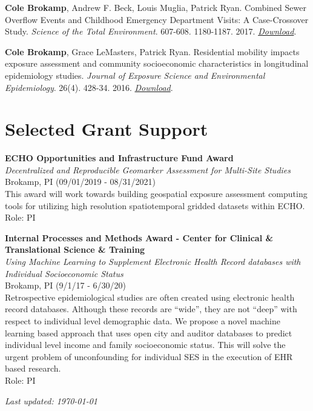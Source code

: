 \documentclass[margin,line]{res}
\begin{document}
\begin{resume}
\textbf{Cole Brokamp}, Andrew F. Beck, Louis Muglia, Patrick Ryan.
Combined Sewer Overflow Events and Childhood Emergency Department
Visits: A Case-Crossover Study. \emph{Science of the Total Environment}.
607-608. 1180-1187. 2017.
\href{http://colebrokamp-website.s3.amazonaws.com/publications/Brokamp_STOTEN_2017.pdf}{\emph{Download}}.

\textbf{Cole Brokamp}, Grace LeMasters, Patrick Ryan. Residential
mobility impacts exposure assessment and community socioeconomic
characteristics in longitudinal epidemiology studies. \emph{Journal of
  Exposure Science and Environmental Epidemiology}. 26(4). 428-34. 2016.
\href{http://colebrokamp-website.s3.amazonaws.com/publications/Brokamp_JESEE_2016.pdf}{\emph{Download}}.

\section{\sc Selected Grant Support}

\textbf{ECHO Opportunities and Infrastructure Fund Award}\\
\emph{Decentralized and Reproducible Geomarker Assessment for Multi-Site
  Studies}\\
Brokamp, PI (09/01/2019 - 08/31/2021)\\
This award will work towards building geospatial exposure assessment
computing tools for utilizing high resolution spatiotemporal gridded
datasets within ECHO.\\
Role: PI

\textbf{Internal Processes and Methods Award - Center for Clinical \&
  Translational Science \& Training}\\
\emph{Using Machine Learning to Supplement Electronic Health Record
  databases with Individual Socioeconomic Status}\\
Brokamp, PI (9/1/17 - 6/30/20)\\
Retrospective epidemiological studies are often created using electronic
health record databases. Although these records are ``wide'', they are
not ``deep'' with respect to individual level demographic data. We
propose a novel machine learning based approach that uses open city and
auditor databases to predict individual level income and family
socioeconomic status. This will solve the urgent problem of
unconfounding for individual SES in the execution of EHR based
research.\\
Role: PI

\end{resume}

\vfill

\hfill \textit{Last updated: \today}
\end{document}
